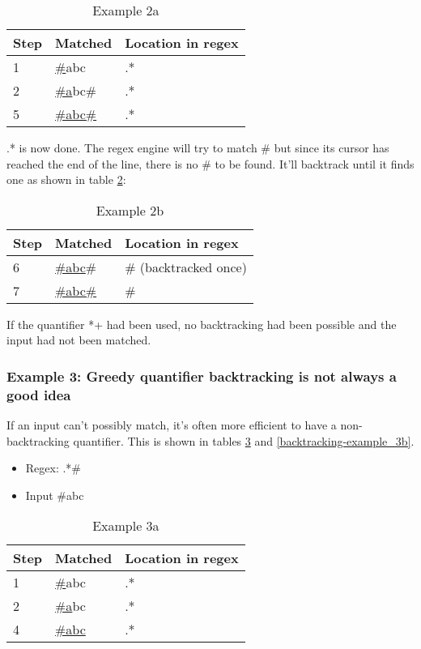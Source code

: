 \begin{table}[!ht]
\center
\begin{tabular}{|l|l|l|}
	\hline
	Step & Matched & Location in regex \\ \hline
	1 & \underline{\#}abc & .* \\ \hline
	2 & \underline{\#a}bc\# & .* \\ \hline
	5 & \underline{\#abc\#} & .* \\
	\hline
\end{tabular}
\caption{Example 2a}\label{backtracking-example_2a}
\end{table}

.* is now done. The regex engine will try to match \# but since its cursor has reached the end of the line, there is no \# to be found. It'll backtrack until it finds one as shown in table \ref{backtracking-example_2b}:

\begin{table}[!ht]
\center
\begin{tabular}{|l|l|l|}
	\hline
	Step & Matched & Location in regex \\ \hline
	6 & \underline{\#abc}\# & \# (backtracked once) \\ \hline
	7 & \underline{\#abc\#} & \# \\
	\hline
\end{tabular}
\caption{Example 2b}\label{backtracking-example_2b}
\end{table}

If the quantifier *+ had been used, no backtracking had been possible and the input had not been matched.

\subsubsection{Example 3: Greedy quantifier backtracking is not always a good idea}

If an input can't possibly match, it's often more efficient to have a non-backtracking quantifier. This is shown in tables \ref{backtracking-example_3a} and \ref{backtracking-example_3b}.

\begin{itemize}
\item Regex: .*\#
\item Input \#abc
\end{itemize}

\begin{table}[!ht]
\center
\begin{tabular}{|l|l|l|}
	\hline
	Step & Matched & Location in regex \\ \hline
	1 & \underline{\#}abc & .* \\ \hline
	2 & \underline{\#a}bc & .* \\ \hline
	4 & \underline{\#abc} & .* \\
	\hline
\end{tabular}
\caption{Example 3a}\label{backtracking-example_3a}
\end{table}

